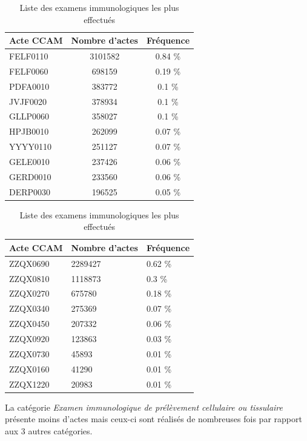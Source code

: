 \bigskip
\bigskip
\bigskip


\begin{table}[!ht]
    \centering
    \begin{minipage}[t]{0.45 \linewidth}
    
\centering
\caption{Liste 10 actes les plus effectués en médecine thérapeutique} 
\label{actes_thera}
\begin{tabular}{lcc}
  \hline
Acte CCAM & Nombre d'actes & Fréquence \\ 
  \hline
FELF0110 & 3101582 & 0.84 \% \\ 
  FELF0060 & 698159 & 0.19 \% \\ 
  PDFA0010 & 383772 & 0.1 \% \\ 
  JVJF0020 & 378934 & 0.1 \% \\ 
  GLLP0060 & 358027 & 0.1 \% \\ 
  HPJB0010 & 262099 & 0.07 \% \\ 
  YYYY0110 & 251127 & 0.07 \% \\ 
  GELE0010 & 237426 & 0.06 \% \\ 
  GERD0010 & 233560 & 0.06 \% \\ 
  DERP0030 & 196525 & 0.05 \% \\ 
   \hline
\end{tabular}

       
    \end{minipage}
    \hfill
    \begin{minipage}[t]{0.48 \linewidth}

\caption{Liste des examens immunologiques les plus effectués}
\label{actes_immu}
\begin{tabular}{lll}
  \hline
Acte CCAM & Nombre d'actes & Fréquence \\ 
  \hline
ZZQX0690 & 2289427 & 0.62 \% \\ 
  ZZQX0810 & 1118873 & 0.3 \% \\ 
  ZZQX0270 & 675780 & 0.18 \% \\ 
  ZZQX0340 & 275369 & 0.07 \% \\ 
  ZZQX0450 & 207332 & 0.06 \% \\ 
  ZZQX0920 & 123863 & 0.03 \% \\ 
  ZZQX0730 & 45893 & 0.01 \% \\ 
  ZZQX0160 & 41290 & 0.01 \% \\ 
  ZZQX1220 & 20983 & 0.01 \% \\
   \hline
\end{tabular}

\bigskip

La catégorie \textit{Examen immunologique de prélèvement cellulaire ou tissulaire} présente moins d'actes mais ceux-ci sont réalisés de nombreuses fois par rapport aux 3 autres catégories.
        
    \end{minipage}
\end{table}

